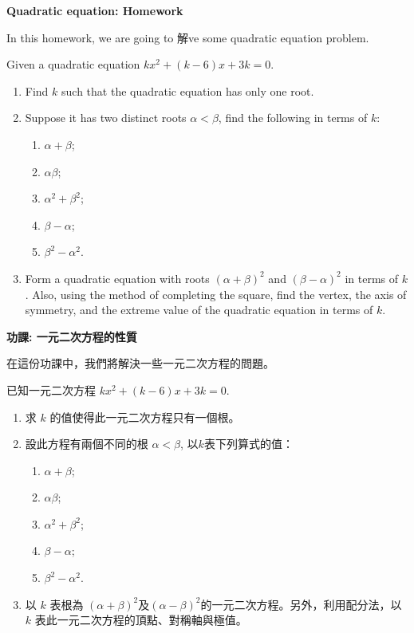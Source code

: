 \documentclass[12pt]{article}
\begin{document}
    \begin{center}
        \textbf{Quadratic equation: Homework}
    \end{center}

    In this homework, we are going to 解ve some quadratic equation problem.

    Given a quadratic equation $kx^2+(k-6)x+3k=0$.\begin{enumerate}
        \item Find $k$ such that the quadratic equation has only one root.
        \item Suppose it has two distinct roots $\alpha<\beta$, find the following in terms of $k$:\begin{enumerate}
            \item $\alpha+\beta$;
            \item $\alpha\beta$;
            \item $\alpha^2+\beta^2$;
            \item $\beta-\alpha$;
            \item $\beta^2-\alpha^2$.
        \end{enumerate}
        \item Form a quadratic equation with roots $(\alpha+\beta)^2$ and $(\beta-\alpha)^2$ in terms of $k$. Also, using the method of completing the square, find the vertex, the axis of symmetry, and the extreme value of the quadratic equation in terms of $k$.
    \end{enumerate}
    \newpage

    \begin{center}
        \textbf{功課: 一元二次方程的性質}
    \end{center}

    在這份功課中，我們將解決一些一元二次方程的問題。

    已知一元二次方程  $kx^2+(k-6)x+3k=0$.\begin{enumerate}
        \item 求 $k$ 的值使得此一元二次方程只有一個根。
        \item 設此方程有兩個不同的根 $\alpha<\beta$, 以$k$表下列算式的值：\begin{enumerate}
            \item $\alpha+\beta$;
            \item $\alpha\beta$;
            \item $\alpha^2+\beta^2$;
            \item $\beta-\alpha$;
            \item $\beta^2-\alpha^2$.
        \end{enumerate}
        \item 以 $k$ 表根為 $(\alpha+\beta)^2$及$(\alpha-\beta)^2$的一元二次方程。另外，利用配分法，以 $k$ 表此一元二次方程的頂點、對稱軸與極值。
    \end{enumerate}
\end{document}
